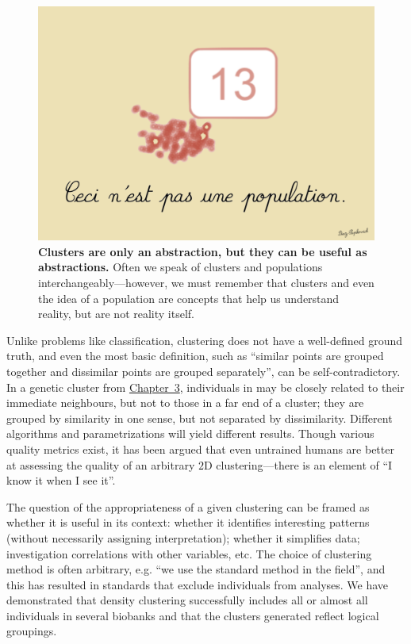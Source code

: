 \begin{figure}[h]
\centering
    \includegraphics[width=0.75\linewidth]{main_figures/discussion/magritte.png}
\caption[The treachery of clustering]{\textbf{Clusters are only an abstraction, but they can be useful as abstractions.} Often we speak of clusters and populations interchangeably---however, we must remember that clusters and even the idea of a population are concepts that help us understand reality, but are not reality itself.}
\label{fig:magritte}
\end{figure}

Unlike problems like classification, clustering does not have a well-defined ground truth, and even the most basic definition, such as ``similar points are grouped together and dissimilar points are grouped separately'', can be self-contradictory\citep{ben-david_clustering_2018}. In a genetic cluster from \hyperref[chap:chapter3]{Chapter~3}, individuals in may be closely related to their immediate neighbours, but not to those in a far end of a cluster; they are grouped by similarity in one sense, but not separated by dissimilarity. Different algorithms and parametrizations will yield different results. Though various quality metrics exist, it has been argued that even untrained humans are better at assessing the quality of an arbitrary $2$D clustering\citep{lewis_human_2012}---there is an element of ``I know it when I see it''. 

The question of the appropriateness of a given clustering can be framed as whether it is useful in its context: whether it identifies interesting patterns (without necessarily assigning interpretation); whether it simplifies data; investigation correlations with other variables, etc\citep{hennig_what_2015}. The choice of clustering method is often arbitrary, e.g. ``we use the standard method in the field''\citep{ben-david_clustering_2018}, and this has resulted in standards that exclude individuals from analyses\citep{ding_polygenic_2023}. We have demonstrated that density clustering successfully includes all or almost all individuals in several biobanks and that the clusters generated reflect logical groupings.
\citep{hennig_what_2015}

